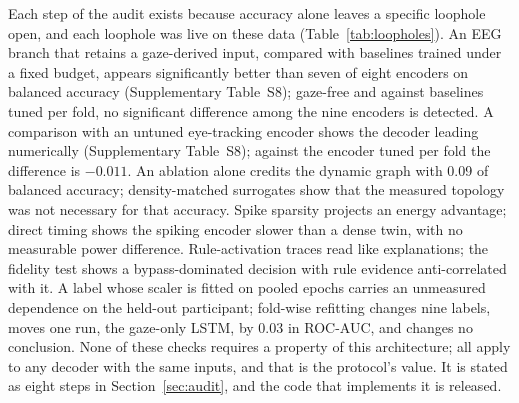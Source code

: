 \documentclass[pdflatex,sn-basic,Numbered,twocolumn,iicol]{sn-jnl}
\theoremstyle{thmstyleone}%
\theoremstyle{thmstyletwo}%
\theoremstyle{thmstylethree}%
\begin{document}
Each step of the audit exists because accuracy alone leaves a specific loophole open, and each loophole was live on these data (Table~\ref{tab:loopholes}). An EEG branch that retains a gaze-derived input, compared with baselines trained under a fixed budget, appears significantly better than seven of eight encoders on balanced accuracy (Supplementary Table~S8); gaze-free and against baselines tuned per fold, no significant difference among the nine encoders is detected. A comparison with an untuned eye-tracking encoder shows the decoder leading numerically (Supplementary Table~S8); against the encoder tuned per fold the difference is $-0.011$. An ablation alone credits the dynamic graph with 0.09 of balanced accuracy; density-matched surrogates show that the measured topology was not necessary for that accuracy. Spike sparsity projects an energy advantage; direct timing shows the spiking encoder slower than a dense twin, with no measurable power difference. Rule-activation traces read like explanations; the fidelity test shows a bypass-dominated decision with rule evidence anti-correlated with it. A label whose scaler is fitted on pooled epochs carries an unmeasured dependence on the held-out participant; fold-wise refitting changes nine labels, moves one run, the gaze-only LSTM, by 0.03 in ROC-AUC, and changes no conclusion. None of these checks requires a property of this architecture; all apply to any decoder with the same inputs, and that is the protocol's value. It is stated as eight steps in Section~\ref{sec:audit}, and the code that implements it is released.
\end{document}
